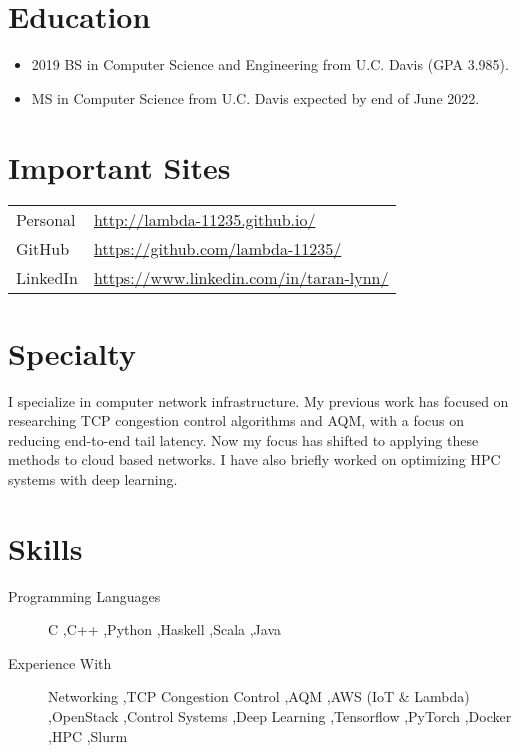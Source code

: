 \documentclass{resume}
\begin{document}

\section*{Education}

\begin{itemize}
\item 2019 BS in Computer Science and Engineering from U.C. Davis
  (GPA 3.985).

\item MS in Computer Science from U.C. Davis expected by end of
  June 2022.
\end{itemize}

\section*{Important Sites}

\begin{tabular}{ll}
    Personal & \url{http://lambda-11235.github.io/}\\
    GitHub & \url{https://github.com/lambda-11235/}\\
    LinkedIn & \url{https://www.linkedin.com/in/taran-lynn/}\\
\end{tabular}


\section*{Specialty}

I specialize in computer network infrastructure.
My previous work has focused on researching TCP congestion control
algorithms and AQM, with a focus on reducing end-to-end tail latency.
Now my focus has shifted to applying these methods to cloud based networks.
I have also briefly worked on optimizing HPC systems with deep learning.


\section*{Skills}

\begin{description}
    \item[Programming Languages]
      C
      \sep C++
      \sep Python
      \sep Haskell
      \sep Scala
      \sep Java

    \item[Experience With]
      Networking
      \sep TCP Congestion Control
      \sep AQM
      \sep AWS (IoT \& Lambda)
      \sep OpenStack
      \sep Control Systems
      \sep Deep Learning
      \sep Tensorflow
      \sep PyTorch
      \sep Docker
      \sep HPC
      \sep Slurm
\end{description}
\end{document}
